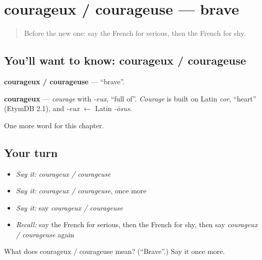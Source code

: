 \section[courageux / courageuse]{courageux / courageuse — brave}

\label{lesson:FR-C190-courageux-courageuse}



\begin{quote}
Before the new one: say the French for serious, then the French for shy.
\end{quote}

\subsection*{You'll want to know: courageux / courageuse}
\textbf{courageux / courageuse} — \textquotedblleft{}brave\textquotedblright{}.

\begin{cousinweb}
\textbf{courageux} — \emph{courage} with \emph{-eux}, \textquotedblleft{}full of\textquotedblright{}. \emph{Courage} is built on Latin \emph{cor}, \textquotedblleft{}heart\textquotedblright{} (EtymDB 2.1), and \emph{-eux} $\leftarrow$ Latin \emph{-ōsus}.
\end{cousinweb}

\begin{grammarlens}[title={What you've built}]
One more word for this chapter.
\end{grammarlens}

\subsection*{Your turn}
\begin{itemize}
\raggedright
  \item \emph{Say it:} \emph{courageux / courageuse}
  \item \emph{Say it:} \emph{courageux / courageuse}, once more
  \item \emph{Say it:} say \emph{courageux / courageuse}
  \item \emph{Recall:} say the French for serious, then the French for shy, then say \emph{courageux / courageuse} again
\end{itemize}

\begin{tcolorbox}[breakable,colback=teal!4,colframe=teal!35!black,title={Before you move on}]
What does courageux / courageuse mean? (\textquotedblleft{}Brave\textquotedblright{}.) Say it once more.
\end{tcolorbox}
